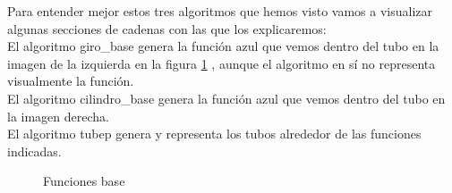  Para entender mejor estos tres algoritmos que hemos visto vamos a visualizar algunas secciones de cadenas con las que los explicaremos:\\
 
 El algoritmo giro\_base genera la función azul que vemos dentro del tubo en la imagen de la izquierda en la figura \ref{final1} , aunque el algoritmo en sí no representa visualmente la función.  \\
 
 El algoritmo cilindro\_base genera la función azul que vemos dentro del tubo en la imagen derecha.\\

 El algoritmo  tubep genera y representa los tubos alrededor de las funciones indicadas. 
 
 \begin{figure}[h!]
 	\centering
 	\space
 	\caption{Funciones base}
 	\label{final1} 
 \end{figure}
 
